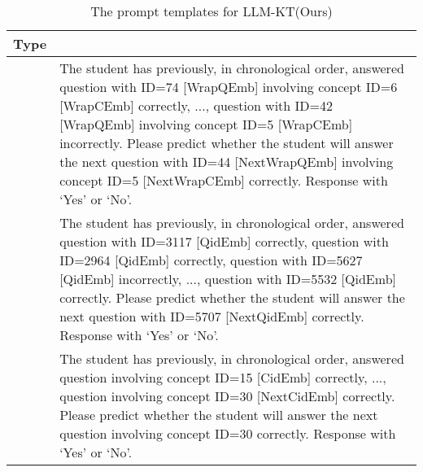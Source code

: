 \appendix


\begin{table*}[hbt!]
\centering
\small
\begin{tabular}{| >{\centering\arraybackslash}m{} | >{\raggedright\arraybackslash}m{} |}
\hline
\rowcolor{lightgray} %
\textbf{Type} & \multicolumn{1}{c|}{\textbf{Template}} \\
\hline
1 & The student has previously, in chronological order, answered question with ID=74 [WrapQEmb]
involving concept ID=6 [WrapCEmb] correctly, ...,
question with ID=42 [WrapQEmb] involving concept ID=5 [WrapCEmb] incorrectly.
Please predict whether the student will answer the next question with ID=44 [NextWrapQEmb]
involving concept ID=5 [NextWrapCEmb] correctly. 
Response with ‘Yes’ or ‘No’. \\
\hline
2 & The student has previously, in chronological order, answered question with ID=3117 [QidEmb]
correctly, question with ID=2964 [QidEmb] correctly, 
question with ID=5627 [QidEmb] incorrectly, ...,
question with ID=5532 [QidEmb] correctly.
Please predict whether the student will answer the next question with ID=5707 [NextQidEmb] correctly.
Response with ‘Yes’ or ‘No’. \\
\hline
3 & The student has previously, in chronological order, answered question involving concept ID=15 [CidEmb]
correctly, ...,
question involving concept ID=30 [NextCidEmb] correctly.
Please predict whether the student will answer the next question involving concept ID=30 correctly.
Response with ‘Yes’ or ‘No’. \\
\hline
\end{tabular}
\caption{The prompt templates for LLM-KT(Ours)}
\label{table:llm-kt-templates}
\end{table*}

